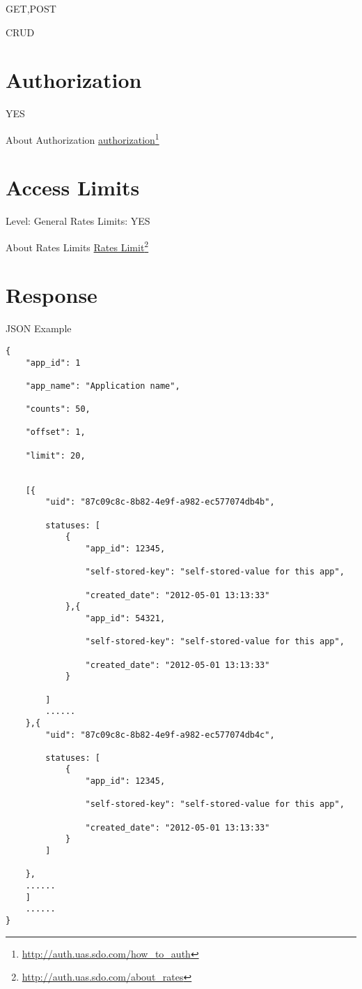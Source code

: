 GET,POST

CRUD

\section{Authorization}
\label{authorization}

YES

About Authorization \href{http://auth.uas.sdo.com/how_to_auth}{authorization}\footnote{\href{http://auth.uas.sdo.com/how_to_auth}{http:/\slash auth.uas.sdo.com\slash how\_to\_auth}}

\section{Access Limits}
\label{accesslimits}

Level: General
Rates Limits: YES

About Rates Limits \href{http://auth.uas.sdo.com/about_rates}{Rates Limit}\footnote{\href{http://auth.uas.sdo.com/about_rates}{http:/\slash auth.uas.sdo.com\slash about\_rates}}

\section{Response}
\label{response}

JSON Example

\begin{verbatim}
{
    "app_id": 1

    "app_name": "Application name",  

    "counts": 50,  

    "offset": 1,  

    "limit": 20,


    [{
        "uid": "87c09c8c-8b82-4e9f-a982-ec577074db4b",

        statuses: [
            {
                "app_id": 12345,

                "self-stored-key": "self-stored-value for this app",

                "created_date": "2012-05-01 13:13:33"
            },{
                "app_id": 54321,

                "self-stored-key": "self-stored-value for this app",

                "created_date": "2012-05-01 13:13:33"
            }

        ]
        ......
    },{
        "uid": "87c09c8c-8b82-4e9f-a982-ec577074db4c",

        statuses: [
            {
                "app_id": 12345,

                "self-stored-key": "self-stored-value for this app",

                "created_date": "2012-05-01 13:13:33"
            }
        ]

    },
    ......
    ]
    ......
}
\end{verbatim}


